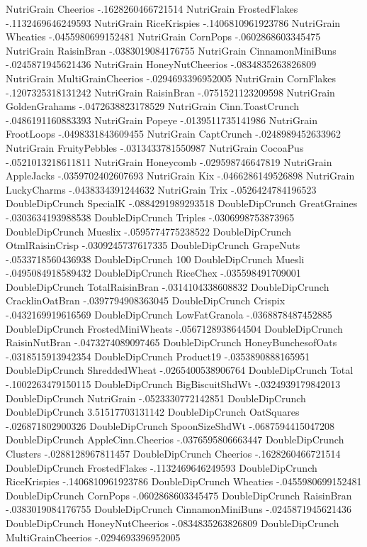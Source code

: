 NutriGrain	Cheerios	-.1628260466721514
NutriGrain	FrostedFlakes	-.1132469646249593
NutriGrain	RiceKrispies	-.1406810961923786
NutriGrain	Wheaties	-.0455980699152481
NutriGrain	CornPops	-.0602868603345475
NutriGrain	RaisinBran	-.0383019084176755
NutriGrain	CinnamonMiniBuns	-.0245871945621436
NutriGrain	HoneyNutCheerios	-.0834835263826809
NutriGrain	MultiGrainCheerios	-.0294693396952005
NutriGrain	CornFlakes	-.1207325318131242
NutriGrain	RaisinBran	-.0751521123209598
NutriGrain	GoldenGrahams	-.0472638823178529
NutriGrain	Cinn.ToastCrunch	-.0486191160883393
NutriGrain	Popeye	-.0139511735141986
NutriGrain	FrootLoops	-.0498331843609455
NutriGrain	CaptCrunch	-.0248989452633962
NutriGrain	FruityPebbles	-.0313433781550987
NutriGrain	CocoaPus	-.0521013218611811
NutriGrain	Honeycomb	-.029598746647819
NutriGrain	AppleJacks	-.0359702402607693
NutriGrain	Kix	-.0466286149526898
NutriGrain	LuckyCharms	-.0438334391244632
NutriGrain	Trix	-.0526424784196523
DoubleDipCrunch	SpecialK	-.0884291989293518
DoubleDipCrunch	GreatGraines	-.0303634193988538
DoubleDipCrunch	Triples	-.0306998753873965
DoubleDipCrunch	Mueslix	-.0595774775238522
DoubleDipCrunch	OtmlRaisinCrisp	-.0309245737617335
DoubleDipCrunch	GrapeNuts	-.0533718560436938
DoubleDipCrunch	100%
DoubleDipCrunch	Muesli	-.0495084918589432
DoubleDipCrunch	RiceChex	-.035598491709001
DoubleDipCrunch	TotalRaisinBran	-.0314104338608832
DoubleDipCrunch	CracklinOatBran	-.0397794908363045
DoubleDipCrunch	Crispix	-.0432169919616569
DoubleDipCrunch	LowFatGranola	-.0368878487452885
DoubleDipCrunch	FrostedMiniWheats	-.0567128938644504
DoubleDipCrunch	RaisinNutBran	-.0473274089097465
DoubleDipCrunch	HoneyBunchesofOats	-.0318515913942354
DoubleDipCrunch	Product19	-.0353890888165951
DoubleDipCrunch	ShreddedWheat	-.0265400538906764
DoubleDipCrunch	Total	-.1002263479150115
DoubleDipCrunch	BigBiscuitShdWt	-.0324939179842013
DoubleDipCrunch	NutriGrain	-.0523330772142851
DoubleDipCrunch	DoubleDipCrunch	3.51517703131142
DoubleDipCrunch	OatSquares	-.026871802900326
DoubleDipCrunch	SpoonSizeShdWt	-.0687594415047208
DoubleDipCrunch	AppleCinn.Cheerios	-.0376595806663447
DoubleDipCrunch	Clusters	-.0288128967811457
DoubleDipCrunch	Cheerios	-.1628260466721514
DoubleDipCrunch	FrostedFlakes	-.1132469646249593
DoubleDipCrunch	RiceKrispies	-.1406810961923786
DoubleDipCrunch	Wheaties	-.0455980699152481
DoubleDipCrunch	CornPops	-.0602868603345475
DoubleDipCrunch	RaisinBran	-.0383019084176755
DoubleDipCrunch	CinnamonMiniBuns	-.0245871945621436
DoubleDipCrunch	HoneyNutCheerios	-.0834835263826809
DoubleDipCrunch	MultiGrainCheerios	-.0294693396952005
